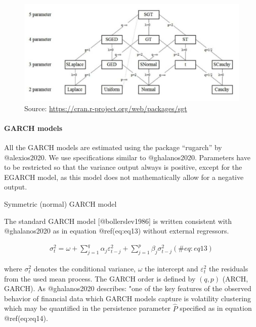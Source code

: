 \documentclass[
]{article}
\begin{document}
\begin{figure}
\centering
\includegraphics[width=6.11458in,height=\textheight]{images/Screenshot 2021-05-21 at 10.30.48.png}
\caption{Source: \url{https://cran.r-project.org/web/packages/sgt}}
\end{figure}

\hypertarget{garch-models}{%
\paragraph{GARCH models}\label{garch-models}}

All the GARCH models are estimated using the package ``rugarch'' by
@alexios2020. We use specifications similar to @ghalanos2020. Parameters
have to be restricted so that the variance output always is positive,
except for the EGARCH model, as this model does not mathematically allow
for a negative output.

Symmetric (normal) GARCH model

\noindent The standard GARCH model {[}@bollerslev1986{]} is written
consistent with @ghalanos2020 as in equation @ref(eq:eq13) without
external regressors.

\begin{align}
\sigma_t^2 = \omega  + \sum\limits_{j = 1}^q {{\alpha_j}\varepsilon _{t-j}^2 +} \sum\limits_{j=1}^p {{\beta_j}\sigma_{t-j}^2} 
 (\#eq:eq13)
\end{align}

\noindent where \(\sigma_t^2\) denotes the conditional variance,
\(\omega\) the intercept and \(\varepsilon_t^2\) the residuals from the
used mean process. The GARCH order is defined by \((q, p)\) (ARCH,
GARCH). As @ghalanos2020 describes: "one of the key features of the
observed behavior of financial data which GARCH models capture is
volatility clustering which may be quantified in the persistence
parameter \(\hat{P}\) specified as in equation @ref(eq:eq14).
\end{document}
